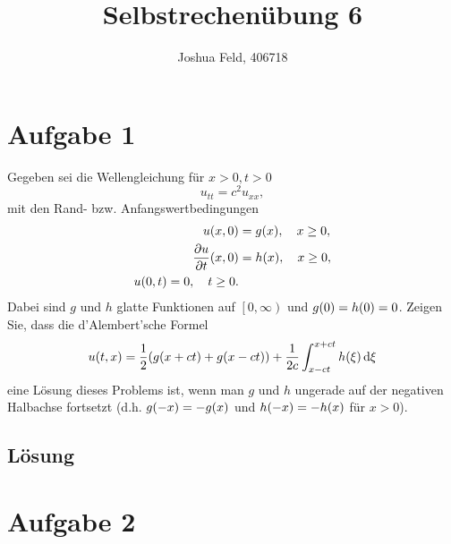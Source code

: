 \documentclass{exercise}
\institute{Applied and Computational Mathematics}
\title{Selbstrechenübung 6}
\author{Joshua Feld, 406718}
\begin{document}
    \maketitle


    \section*{Aufgabe 1}
    
    \begin{problem}
        Gegeben sei die Wellengleichung für \(x > 0, t > 0\)
        \[
            u_{tt} = c^2 u_{xx},
        \]
        mit den Rand- bzw. Anfangswertbedingungen
        \begin{align*}
            u\parentheses*{x, 0} &= g\parentheses*{x}, \quad x \ge 0,\\
            \frac{\partial u}{\partial t}\parentheses*{x, 0} &= h\parentheses*{x}, \quad x \ge 0,\\
            u\parentheses*{0, t} = 0, \quad t \ge 0.
        \end{align*}
        Dabei sind \(g\) und \(h\) glatte Funktionen auf \(\left[0, \infty\right)\) und \(g\parentheses*{0} = h\parentheses*{0} = 0\).
        Zeigen Sie, dass die d'Alembert'sche Formel
        \[
            u\parentheses*{t, x} = \frac{1}{2}\parentheses*{g\parentheses*{x + ct} + g\parentheses*{x - ct}} + \frac{1}{2c}\int_{x - ct}^{x + ct}h\parentheses*{\xi}\d\xi
        \]
        eine Lösung dieses Problems ist, wenn man \(g\) und \(h\) ungerade auf der negativen Halbachse fortsetzt (d.h. \(g\parentheses*{-x} = -g\parentheses*{x}\) und \(h\parentheses*{-x} = -h\parentheses*{x}\) für \(x > 0\)).
    \end{problem}
    
    \subsection*{Lösung}


    \section*{Aufgabe 2}
    
\end{document}
